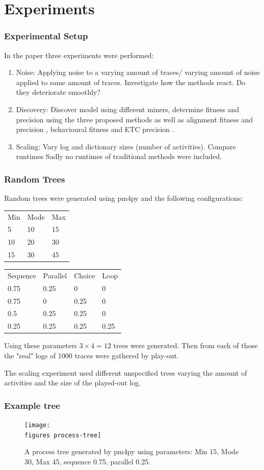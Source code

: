 \documentclass{beamer}
\newcommand{\figures}{../figures/}
\begin{document}
	\section{Experiments}
	\begin{frame}
		\frametitle{Experimental Setup}
		In the paper three experiments were performed:
		\begin{enumerate}
			\item Noise: Applying noise to a varying amount of traces/ varying amount of noise applied to same amount of traces. Investigate how the methods react. Do they deteriorate smoothly?
			\item Discovery: Discover model using different miners, determine fitness and precision using the three proposed methods as well as alignment fitness and precision \cite{Aals16}, behavioural fitness \cite{GMVB09} and ETC precision \cite{MuCa10}.
			\item Scaling: Vary log and dictionary sizes (number of activities). Compare runtimes \alert{Sadly no runtimes of traditional methods were included.}
		\end{enumerate}
	\end{frame}
	\begin{frame}
		\frametitle{Random Trees}
		Random trees were generated using pm4py and the following configurations:
		
		\begin{center}
		\begin{tabular}{lll}
			Min & Mode & Max \\
			5 & 10 & 15 \\
			10 & 20 & 30 \\
			15 & 30 & 45 \\
		\end{tabular}
	\hspace{40pt}
		\begin{tabular}{llll}
			Sequence & Parallel & Choice & Loop \\
			0.75 & 0.25 & 0 & 0 \\
			0.75 & 0 & 0.25 & 0 \\
			0.5 & 0.25 & 0.25 & 0 \\
			0.25 & 0.25 & 0.25 & 0.25 \\
		\end{tabular}
	\end{center}

		Using these parameters $3\times4=12$ trees were generated.
		Then from each of those the "real" logs of 1000 traces were gathered by play-out.
		
		The scaling experiment used different unspecified trees varying the amount of activities and the size of the played-out log.
	\end{frame}
	\begin{frame}
		\frametitle{Example tree}
		\begin{figure}
			\texttt{[image: \\figures process-tree]}
			\caption{A process tree generated by pm4py using parameters: Min 15, Mode 30, Max 45, sequence 0.75, parallel 0.25. }
			\label{fig:process-tree}
		\end{figure}
	\end{frame}
	
\end{document}
